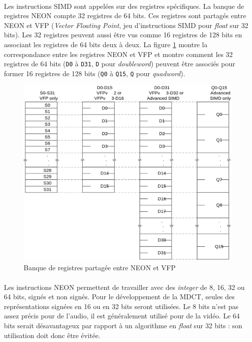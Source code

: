 \documentclass{article}
\begin{document}
    \paragraph{}
    Les instructions SIMD sont appelées sur des registres spécifiques. La banque de registres NEON compte 32 registres de 64 bits. Ces registres sont partagés entre NEON et VFP (\emph{Vector Floating Point}, jeu d'instructions SIMD pour \emph{float} sur 32 bits). Les 32 registres peuvent aussi être vus comme 16 registres de 128 bits en associant les registres de 64 bits deux à deux\cite{DOC-ARM}. La figure \ref{fig:neon-registers} montre la correspondance entre les registres NEON et VFP et montre comment les 32 registres de 64 bits (\texttt{D0} à \texttt{D31}, \texttt{D} pour \emph{doubleword}) peuvent être associés pour former 16 registres de 128 bits (\texttt{Q0} à \texttt{Q15}, \texttt{Q} pour \emph{quadword}).

    \begin{figure}[H]
        \centering
        \includegraphics[width=.6\linewidth]{./images/neon-registers.png}
        \caption{Banque de registres partagée entre NEON et VFP}
        \label{fig:neon-registers}
    \end{figure}

    \paragraph{}
    Les instructions NEON permettent de travailler avec des \emph{integer} de 8, 16, 32 ou 64 bits, signés et non signés. Pour le développement de la MDCT, seules des représentations signées en 16 ou en 32 bits seront utilisées. Le 8 bits n'est pas assez précis pour de l'audio, il est généralement utilisé pour de la vidéo. Le 64 bits serait désavantageux par rapport à un algorithme en \emph{float} sur 32 bits : son utilisation doit donc être évitée.
\end{document}
